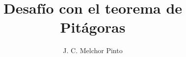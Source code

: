 \documentclass[12pt]{guia}
\title{Desafío con el teorema de Pitágoras}
\author{J. C. Melchor Pinto}
\begin{document}
\pagestyle{headandfoot}
\addpoints
\INFO
\printanswers

\newpage
\begin{questions}
    
    
    
    
    
    
    
    
    
\end{questions}
\end{document}
